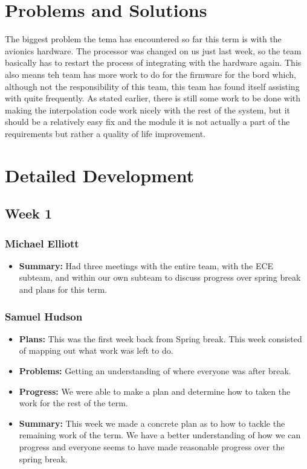 \documentclass[onecolumn, draftclsnofoot,10pt, compsoc]{IEEEtran}
\begin{document}
\section {Problems and Solutions}
The biggest problem the tema has encountered so far this term is with the avionics hardware.
The processor was changed on us just last week, so the team basically has
to restart the process of integrating with the hardware again.
This also means teh team has more work to do for the firmware for the bord
which, although not the responsibility of this team, this team has found
itself assisting with quite frequently.
As stated earlier, there is still some work to be done with making the
interpolation code work nicely with the rest of the system, but it
should be a relatively easy fix and the module it is not actually a
part of the requirements but rather a quality of life improvement.
\section {Detailed Development}
\subsection {Week 1}
\subsubsection{Michael Elliott}
\begin {itemize}
 \item \textbf{Summary: }Had three meetings with the entire team, with the ECE subteam, and
within our own subteam to discuss progress over spring break and plans
for this term.
\end{itemize}
\subsubsection{Samuel Hudson}
\begin {itemize}
 \item \textbf{Plans: }This was the first week back from Spring break. This week consisted of mapping out what work was left to do.   
 \item \textbf{Problems: }Getting an understanding of where everyone was after break.
 \item \textbf{Progress: }We were able to make a plan and determine how to taken the work for the rest of the term.
 \item \textbf{Summary: }This week we made a concrete plan as to how to tackle the remaining work of the term. We have a better understanding of how we can progress and everyone seems to have made reasonable progress over the spring break.  
\end {itemize}
\end{document}
